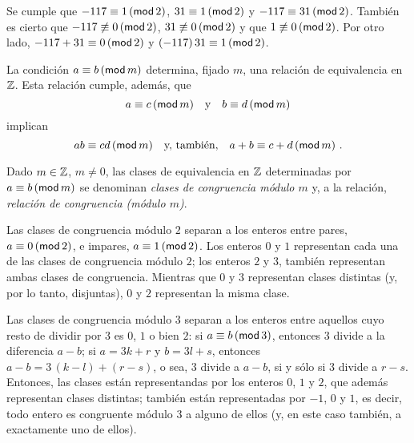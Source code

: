 \begin{ejemCongruencias}\label{ejem:congruencias:bis}
	Se cumple que $-117\equiv 1\tmodulo[2]$, $31\equiv 1\tmodulo[2]$ y
	$-117\equiv 31\tmodulo[2]$. Tambi\'en es cierto que
	$-117\not\equiv 0\tmodulo[2]$, $31\not\equiv 0\tmodulo[2]$ y que
	$1\not\equiv 0\tmodulo[2]$. Por otro lado,
	$-117 + 31\equiv 0\tmodulo[2]$ y $(-117)\,31\equiv 1\tmodulo[2]$.
\end{ejemCongruencias}

\begin{teoCongruencias}\label{teo:congruencias}
	La condici\'on $a\equiv b\tmodulo[m]$ determina, fijado $m$, una
	relaci\'on de equivalencia en $\Enteros$. Esta relaci\'on cumple,
	adem\'as, que
	\begin{displaymath}
		a\equiv c\tmodulo[m]\quad\text{y}\quad
		b\equiv d\tmodulo[m]
	\end{displaymath}
	implican
	\begin{displaymath}
		ab\equiv cd\tmodulo[m] \quad\text{y, tambi\'en,}\quad
		a+b\equiv c+d\tmodulo[m]
		\text{ .}
	\end{displaymath}
\end{teoCongruencias}

\begin{defCongruencias}\label{def:congruencias:clases}
	Dado $m\in\Enteros$, $m\neq 0$, las clases de equivalencia en
	$\Enteros$ determinadas por $a\equiv b\tmodulo[m]$ se denominan
	\emph{clases de congruencia m\'odulo $m$} y, a la relaci\'on,
	\emph{relaci\'on de congruencia (m\'odulo $m$)}.
\end{defCongruencias}

\begin{ejemCongruencias}\label{ejem:congruencias:clases}
	Las clases de congruencia m\'odulo $2$ separan a los enteros entre
	pares, $a\equiv 0\tmodulo[2]$, e impares, $a\equiv 1\tmodulo[2]$.
	Los enteros $0$ y $1$ representan cada una de las clases de
	congruencia m\'odulo $2$; los enteros $2$ y $3$, tambi\'en
	representan ambas clases de congruencia. Mientras que $0$ y $3$
	representan clases distintas (y, por lo tanto, disjuntas),
	$0$ y $2$ representan la misma clase.
\end{ejemCongruencias}

\begin{ejemCongruencias}\label{ejem:congruencias:clases:bis}
	Las clases de congruencia m\'odulo $3$ separan a los enteros entre
	aquellos cuyo resto de dividir por $3$ es $0$, $1$ o bien $2$:
	si $a\equiv b\tmodulo[3]$, entonces $3$ divide a la diferencia
	$a-b$; si $a=3k+r$ y $b=3l+s$, entonces $a-b=3\,(k-l)+(r-s)$, o sea,
	$3$ divide a $a-b$, si y s\'olo si $3$ divide a $r-s$. Entonces,
	las clases est\'an representandas por los enteros
	$0$, $1$ y $2$, que adem\'as representan clases distintas;
	tambi\'en est\'an representadas por $-1$, $0$ y $1$, es decir, todo
	entero es congruente m\'odulo $3$ a alguno de ellos (y, en este caso
	tambi\'en, a exactamente uno de ellos).
\end{ejemCongruencias}

